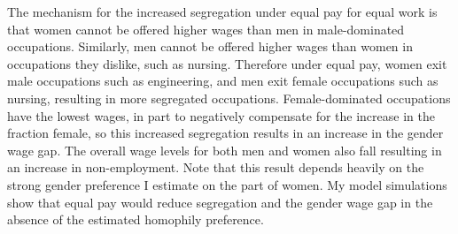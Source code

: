 \documentclass[12pt]{article}
\begin{document}
The mechanism for the increased segregation under equal pay for equal work is that women cannot be offered higher wages than men in male-dominated occupations. Similarly, men cannot be offered higher wages than women in occupations they dislike, such as nursing. Therefore under equal pay, women exit male occupations such as engineering, and men exit female occupations such as nursing, resulting in more segregated occupations. Female-dominated occupations have the lowest wages, in part to negatively compensate for the increase in the fraction female, so this increased segregation results in an increase in the gender wage gap. The overall wage levels for both men and women also fall resulting in an increase in non-employment. Note that this result depends heavily on the strong gender preference I estimate on the part of women. My model simulations show that equal pay would reduce segregation and the gender wage gap in the absence of the estimated homophily preference.










\end{document}
